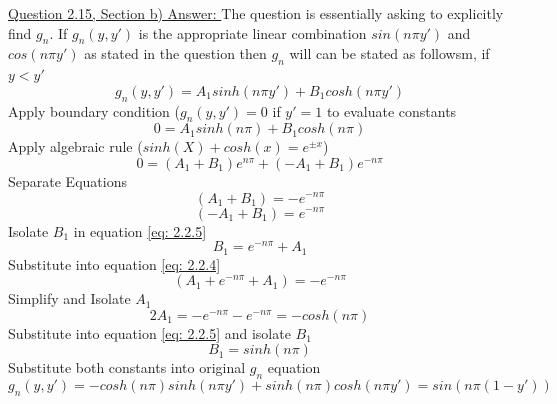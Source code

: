 \documentclass[12pt]{article}
\begin{document}
    \underline{Question 2.15, Section b) Answer: }
    \newline The question is essentially asking to explicitly find $g_n$. 
    \newline If $g_n(y,y')$ is the appropriate linear combination $sin(n \pi y')$ and $cos(n \pi y')$ as stated in the question then $g_n$ will can be stated as followsm, if $y<y'$
    \begin{equation} \label{eq: 2.2.1}
        g_n(y,y') = A_1 sinh(n \pi y') + B_1 cosh(n \pi y')  
    \end{equation}
    Apply boundary condition ($g_n(y,y') = 0$ if $y'=1$ to evaluate constants
    \begin{equation} \label{eq: 2.2.2}
        0 = A_1 sinh(n \pi) + B_1 cosh(n \pi)  
    \end{equation}
    Apply algebraic rule ($sinh(X) + cosh(x) = e^{\pm x}$)
    \begin{equation} \label{eq: 2.2.3}
        0 = (A_1 + B_1) e^{n \pi} + (-A_1 + B_1) e^{-n \pi}
    \end{equation}
    Separate Equations
    \begin{equation} \label{eq: 2.2.4}
        (A_1 + B_1) = -e^{-n \pi}
    \end{equation}
    \begin{equation} \label{eq: 2.2.5}
        (-A_1 + B_1) = e^{-n \pi}
    \end{equation}
    Isolate $B_1$ in equation \ref{eq: 2.2.5}
    \begin{equation} \label{eq: 2.2.6}
        B_1 = e^{-n \pi} + A_1
    \end{equation}
    Substitute into equation \ref{eq: 2.2.4}
    \begin{equation} \label{eq: 2.2.7}
        (A_1 + e^{-n \pi} + A_1) = -e^{-n \pi}
    \end{equation}
    Simplify and Isolate $A_1$
    \begin{equation} \label{eq: 2.2.8}
        2 A_1 = -e^{-n \pi} - e^{-n \pi} = -cosh(n \pi)
    \end{equation}
    Substitute into equation \ref{eq: 2.2.5} and isolate $B_1$
    \begin{equation} \label{eq: 2.2.9}
        B_1 = sinh(n \pi)
    \end{equation}
    Substitute both constants into original $g_n$ equation
    \begin{equation} \label{eq: 2.2.10}
        g_n(y,y') = -cosh(n \pi) sinh(n \pi y') + sinh(n \pi) cosh(n \pi y') = sin(n \pi (1-y'))
    \end{equation}
\end{document}
